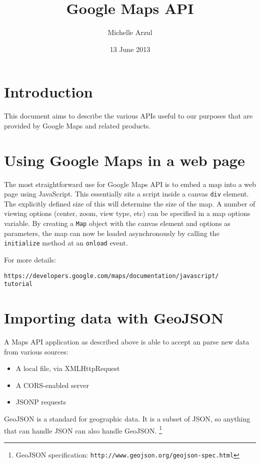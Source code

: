 \documentclass{article}
\title{Google Maps API}
\date{13 June 2013}
\author{Michelle Arzul}
\begin{document}
\maketitle

\section{Introduction}

This document aims to describe the various APIs useful to our purposes that are provided by Google Maps and related products.

\section{Using Google Maps in a web page}

The most straightforward use for Google Maps API is to embed a map into a web page using JavaScript. This essentially sits a script inside a canvas \texttt{div} element. The explicitly defined size of this will determine the size of the map. A number of viewing options (center, zoom, view type, etc) can be specified in a map options variable. By creating a \texttt{Map} object with the canvas element and options as parameters, the map can now be loaded asynchronously by calling the \texttt{initialize} method at an \texttt{onload} event.

For more details:

\noindent\texttt{https://developers.google.com/maps/documentation/javascript/\\tutorial}

\section{Importing data with GeoJSON}

A Maps API application as described above is able to accept an parse new data from various sources:
\begin{itemize}
\item A local file, via XMLHttpRequest
\item A CORS-enabled server
\item JSONP requests
\end{itemize}

GeoJSON is a standard for geographic data. It is a subset of JSON, so anything that can handle JSON can also handle GeoJSON. \footnote{GeoJSON specification: \texttt{http://www.geojson.org/geojson-spec.html}}
\end{document}

